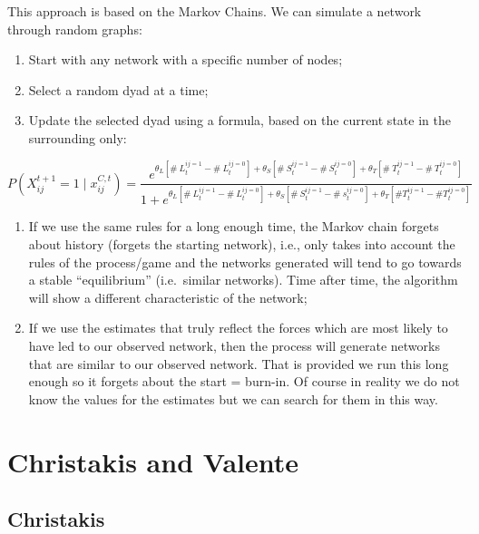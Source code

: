 \documentclass[
  notitlepage,
  onecolumn,
  openany]{book}
\providecommand{\tightlist}{%
  \setlength{\itemsep}{0pt}\setlength{\parskip}{0pt}}
\begin{document}
This approach is based on the Markov Chains. We can simulate a network through random graphs:

\begin{enumerate}
\def\labelenumi{\arabic{enumi}.}
\tightlist
\item
  Start with any network with a specific number of nodes;
\item
  Select a random dyad at a time;
\item
  Update the selected dyad using a formula, based on the current state in the surrounding only:
\end{enumerate}

\[
P\left(X_{ij}^{t+1}=1 \mid x_{ij}^{C, t}\right)= \frac{e^{\theta_{L}\left[\# ~L_{t}^{ij=1}-\# ~L_{t}^{ij=0}\right]+\theta_{S}\left[\# ~S_{t}^{ij=1}-\# ~S_{t}^{ij=0}\right]+\theta_{T}\left[\# ~T_{t}^{ij=1}-\# {~T}_{t}^{ij=0}\right]}}{1+e^{\theta_{L}\left[\# ~L_{t}^{ij=1}-\# ~L_{t}^{ij=0}\right]+\theta_{S}\left[\# ~S_{t}^{ij=1}-\# ~s_{t}^{ij=0}\right]+\theta_{T} \left[\# T_{t}^{ij=1}-\# T_{t}^{ij=0}\right]}}
\]

\begin{enumerate}
\def\labelenumi{\arabic{enumi}.}
\setcounter{enumi}{3}
\item
  If we use the same rules for a long enough time, the Markov chain forgets about history
  (forgets the starting network), i.e., only takes into account the rules of the process/game and the networks generated will tend to go towards a stable ``equilibrium'' (i.e.~similar networks). Time after time, the algorithm will show a different characteristic of the network;
\item
  If we use the estimates that truly reflect the forces which are most likely to have led to our observed network, then the process will generate networks that are similar to our observed
  network. That is provided we run this long enough so it forgets about the start = burn-in. Of course in reality we do not know the values for the estimates but we can search for them in this way.
\end{enumerate}

\hypertarget{christakis-and-valente}{%
\chapter{Christakis and Valente}\label{christakis-and-valente}}

\hypertarget{christakis}{%
\section{Christakis}\label{christakis}}
\end{document}

